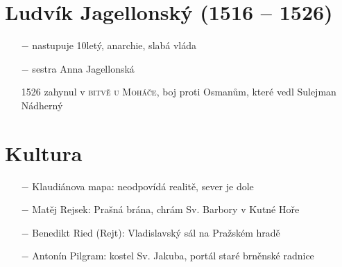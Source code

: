 \documentclass{article}
\begin{document}
\section*{Ludvík Jagellonský (1516 – 1526)}
\begin{itemize}
    \vspace{-0.5em}
    \setlength\itemsep{0.15em}
    \item[$-$] nastupuje 10letý, anarchie, slabá vláda
    \item[$-$] sestra Anna Jagellonská
    \item[1526] zahynul v \textsc{bitvě u Moháče}, boj proti Osmanům, které vedl Sulejman Nádherný


\end{itemize}

\section*{Kultura}
\begin{itemize}
    \vspace{-0.5em}
    \setlength\itemsep{0.15em}
    \item[$-$] Klaudiánova mapa: neodpovídá realitě, sever je dole
    \item[$-$] Matěj Rejsek: Prašná brána, chrám Sv. Barbory v Kutné Hoře
    \item[$-$] Benedikt Ried (Rejt): Vladislavský sál na Pražském hradě
    \item[$-$] Antonín Pilgram: kostel Sv. Jakuba, portál staré brněnské radnice
\end{itemize}
\end{document}

